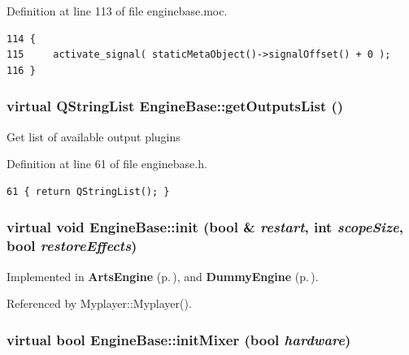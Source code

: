 Definition at line 113 of file enginebase.moc.



\footnotesize\begin{verbatim}114 {
115     activate_signal( staticMetaObject()->signalOffset() + 0 );
116 }
\end{verbatim}\normalsize 
{}
\subsubsection{\setlength{\rightskip}{0pt plus 5cm}virtual QString\-List Engine\-Base::get\-Outputs\-List ()\hspace{0.3cm}{\tt  [inline, virtual]}}\label{classEngineBase_EngineBasea6}


Get list of available output plugins 

Definition at line 61 of file enginebase.h.



\footnotesize\begin{verbatim}61 { return QStringList(); }
\end{verbatim}\normalsize 
{}
\subsubsection{\setlength{\rightskip}{0pt plus 5cm}virtual void Engine\-Base::init (bool \& {\em restart}, int {\em scope\-Size}, bool {\em restore\-Effects})\hspace{0.3cm}{\tt  [pure virtual]}}\label{classEngineBase_EngineBasea2}




Implemented in {\bf Arts\-Engine} {\rm (p.\,\pageref{classArtsEngine_ArtsEnginea2})}, and {\bf Dummy\-Engine} {\rm (p.\,\pageref{classDummyEngine_DummyEngined0})}.

Referenced by Myplayer::Myplayer().
\subsubsection{\setlength{\rightskip}{0pt plus 5cm}virtual bool Engine\-Base::init\-Mixer (bool {\em hardware})\hspace{0.3cm}{\tt  [pure virtual]}}\label{classEngineBase_EngineBasea3}


